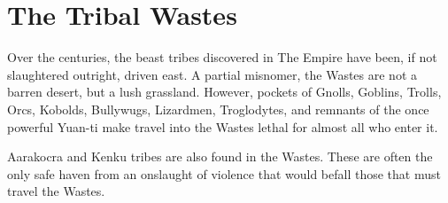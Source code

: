 \section{The Tribal Wastes}

Over the centuries, the beast tribes discovered in The Empire have been,
 if not slaughtered outright, driven east.
A partial misnomer, the Wastes are not a barren desert, but a lush grassland.
However, pockets of Gnolls, Goblins, Trolls, Orcs, Kobolds, Bullywugs, Lizardmen, Troglodytes, and
 remnants of the once powerful Yuan-ti make travel into the Wastes lethal for almost
 all who enter it.

Aarakocra and Kenku tribes are also found in the Wastes.
These are often the only safe haven from an onslaught of violence that would befall those
 that must travel the Wastes.
